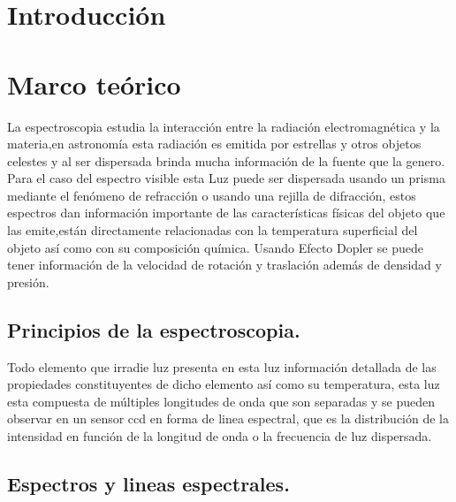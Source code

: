 \documentclass[11pt]{article}
\begin{document}
\section{Introducci\'on}














\section{Marco teórico}
La espectroscopia estudia la interacción entre la radiación electromagnética y la materia,en astronomía esta radiación es emitida por estrellas y otros objetos celestes y al ser dispersada brinda mucha información de la fuente que la genero.\\
Para el caso del espectro visible esta Luz puede ser dispersada usando un prisma mediante el fenómeno de refracción o usando una rejilla de difracción, estos espectros dan información importante de las características físicas del objeto que las emite,están directamente relacionadas con la temperatura superficial del objeto así como con su composición química. Usando Efecto Dopler se puede tener información de la velocidad de rotación y traslación además de densidad y presión.
\cite{utilidad}\\

\subsection {Principios de la espectroscopia.}
Todo elemento que  irradie luz presenta en esta luz información detallada de las propiedades constituyentes de dicho elemento así como su temperatura, esta luz esta compuesta de múltiples longitudes de onda que son separadas y se pueden observar en un sensor ccd en forma de linea espectral, que es la distribución de  la intensidad en función de la longitud de onda o la frecuencia  de luz dispersada.

\subsection {Espectros y lineas espectrales.}
\end{document}

